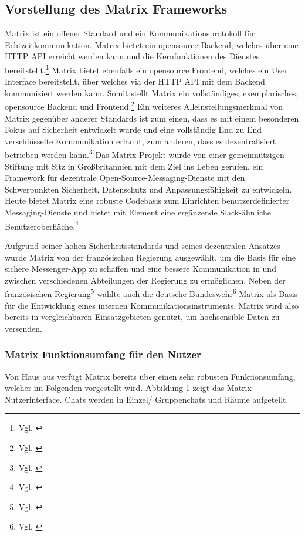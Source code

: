 \subsection{Vorstellung des Matrix Frameworks}\label{chapter:vdmf}
Matrix ist ein offener Standard und ein Kommunikationsprotokoll für  Echtzeitkommunikation. Matrix bietet ein opensource Backend, welches über eine HTTP API erreicht werden kann und die Kernfunktionen des Dienstes bereitstellt.\footnote{Vgl. \cite{Matrix.org2020}} Matrix bietet ebenfalls ein opensource Frontend, welches ein User Interface bereitstellt, über welches via der HTTP API mit dem Backend kommuniziert werden kann. Somit stellt Matrix ein vollständiges, exemplarisches, opensource Backend und Frontend.\footnote{Vgl. \cite{Github2020}} 
Ein weiteres Alleinstellungsmerkmal von Matrix gegenüber anderer Standards ist zum einen, dass es mit einem besonderen Fokus auf Sicherheit entwickelt wurde und eine vollständig End zu End verschlüsselte Kommunikation  erlaubt, zum anderen, dass es dezentralisiert betrieben werden kann.\footnote{Vgl. \cite{Nccgroup2016}}
Das Matrix-Projekt wurde von einer gemeinnützigen Stiftung mit Sitz in Großbritannien mit dem Ziel ins Leben gerufen, ein Framework für dezentrale Open-Source-Messaging-Dienste mit den Schwerpunkten Sicherheit, Datenschutz und Anpassungsfähigkeit zu entwickeln. Heute bietet Matrix eine robuste Codebasis zum Einrichten benutzerdefinierter Messaging-Dienste und bietet mit Element eine ergänzende Slack-ähnliche Benutzeroberfläche.\footnote{Vgl. \cite{Matrix.org2020}}

Aufgrund seiner hohen Sicherheitsstandards und seines dezentralen Ansatzes wurde Matrix  von der französischen Regierung ausgewählt, um die Basis für eine sichere Messenger-App zu schaffen und eine bessere Kommunikation in und zwischen verschiedenen Abteilungen der Regierung zu ermöglichen. Neben der französischen Regierung\footnote{Vgl. \cite{Republique-Francaise2018}} wählte auch die deutsche Bundeswehr\footnote{Vgl. \cite{Weiss2020}} Matrix als Basis für die Entwicklung eines internen Kommunikationsinstruments. Matrix wird also bereits in vergleichbaren Einsatzgebieten genutzt, um hochsensible Daten zu versenden.

\subsubsection{Matrix Funktionsumfang für den Nutzer}\label{chapter:aemn}
Von Haus aus verfügt Matrix bereits über einen sehr robusten Funktionsumfang, welcher im Folgenden vorgestellt wird.
Abbildung 1 zeigt das Matrix-Nutzerinterface. Chats werden in Einzel/ Gruppenchats und Räume aufgeteilt.


